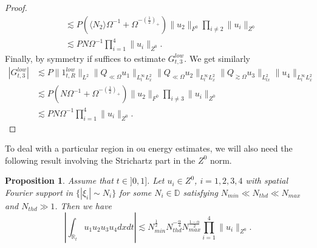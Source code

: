 \documentclass{amsart}
\newtheorem{proposition}[theorem]{Proposition}
\theoremstyle{definition}
\theoremstyle{remark}
\def\R{{\mathbb R}}
\def\D{{\mathbb D}}
\numberwithin{equation}{section}
\newcommand\cro[1]{\langle #1 \rangle}
\begin{document}
\begin{proof}
\begin{align*}
    &\lesssim P(\cro{N_2}\Omega^{-1}+\Omega^{-(\frac 12)_+}) \|u_2\|_{F^0} \prod_{i\neq 2} \|u_i\|_{Z^0}\\
    &\lesssim PN\Omega^{-1} \prod_{i=1}^4 \|u_i\|_{Z^0}.
  \end{align*}
  Finally, by symmetry if suffices to estimate $G_{t,3}^{low}$. We get similarly
  \begin{align*}
    |G_{t,3}^{low}| &\lesssim P \|1_{t,R}^{low}\|_{L^2} \|Q_{\ll \Omega}u_1\|_{L^\infty_tL^2_x} \|Q_{\ll \Omega} u_2\|_{L^\infty_tL^2_x} \|Q_{\gtrsim \Omega}u_3\|_{L^2_{tx}} \|u_4\|_{L^\infty_tL^2_x}\\
    &\lesssim P(N\Omega^{-1}+\Omega^{-(\frac 12)_+}) \|u_2\|_{F^0} \prod_{i\neq 3} \|u_i\|_{Z^0}\\
    &\lesssim PN\Omega^{-1} \prod_{i=1}^4 \|u_i\|_{Z^0}.
  \end{align*}  
\end{proof}
To deal with a particular region in ou energy estimates, we will also need the following result involving the Strichartz part in the $Z^0$ norm.
\begin{proposition}\label{prop:l2tri.2}
 Assume that $t \in ]0,1]$. Let $u_i\in Z^0$, $i=1,2,3,4$ with spatial Fourier support in $\{|\xi_i|\sim N_i\}$ for some $N_i\in\D$ satisfying $N_{min}\ll N_{thd}\ll N_{max}$ and $N_{thd}\gg 1$. Then we have
  \begin{equation}\label{l2tri.3}
    \left|\int_{\R_t} u_1u_2u_3u_4 dxdt\right| \lesssim N_{min}^{\frac 12}N_{thd}^{-\frac \alpha 4} N_{max}^{\frac{1-\alpha}2} \prod_{i=1}^4 \|u_i\|_{Z^0}.
  \end{equation}
\end{proposition}
\end{document}
